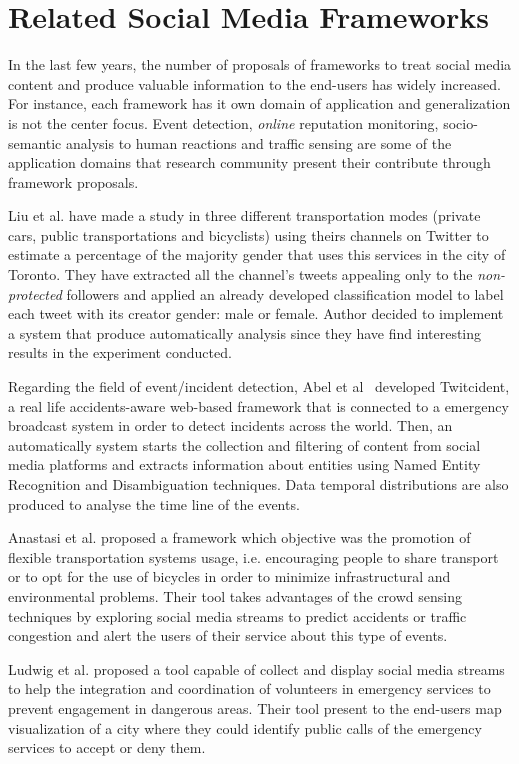 \section{Related Social Media Frameworks}

In the last few years, the number of proposals of frameworks to treat social media content and produce valuable information to the end-users has widely increased. For instance, each framework has it own domain of application and generalization is not the center focus. Event detection, \textit{online} reputation monitoring, socio-semantic analysis to human reactions and traffic sensing are some of the application domains that research community present their contribute through framework proposals.

Liu et al. \cite{liu2012using} have made a study in three different transportation modes (private cars, public transportations and bicyclists) using theirs channels on Twitter to estimate a percentage of the majority gender that uses this services in the city of Toronto. They have extracted all the channel's tweets appealing only to the \textit{non-protected} followers and applied an already developed classification model to label each tweet with its creator gender: male or female. Author decided to implement a system that produce automatically analysis since they have find interesting results in the experiment conducted.

Regarding the field of event/incident detection, Abel et al~\cite{abel2012twitcident} developed Twitcident, a real life accidents-aware web-based framework that is connected to a emergency broadcast system in order to detect incidents across the world. Then, an automatically system starts the collection and filtering of content from social media platforms and extracts information about entities using Named Entity Recognition and Disambiguation techniques. Data temporal distributions are also produced to analyse the time line of the events.

Anastasi et al. \cite{anastasi2013urban} proposed a framework which objective was the promotion of flexible transportation systems usage, i.e. encouraging people to share transport or to opt for the use of bicycles in order to minimize infrastructural and environmental problems. Their tool takes advantages of the crowd sensing techniques by exploring social media streams to predict accidents or traffic congestion and alert the users of their service about this type of events.

Ludwig et al. \cite{ludwig2015crowdmonitor} proposed a tool capable of collect and display social media streams to help the integration and coordination of volunteers in emergency services to prevent engagement in dangerous areas. Their tool present to the end-users map visualization of a city where they could identify public calls of the emergency services to accept or deny them.

